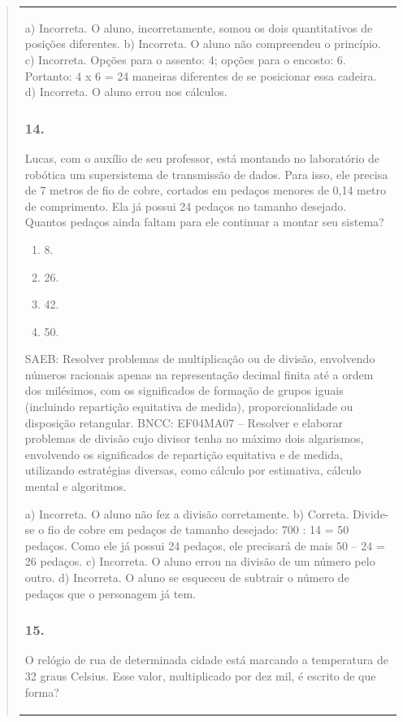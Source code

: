\begin{mdframed}[linewidth=2pt,linecolor=salmao,roundcorner=2pt]
\begin{itemize}
{\begin{itemize}
\begin{escolha}
{\begin{quote}
{\begin{escolha}
{{{{{\begin{longtable}[]{@{}l@{}}
\begin{itemize}
{a) Incorreta. O aluno, incorretamente, somou os dois quantitativos de posições diferentes.
b) Incorreta. O aluno não compreendeu o princípio.
c) Incorreta. Opções para o assento: 4; opções para o encosto: 6. Portanto: 4 x 6 = 24 maneiras diferentes de se posicionar essa cadeira.
d) Incorreta. O aluno errou nos cálculos.

\subsubsection{14.}

Lucas, com o auxílio de seu professor, está montando no laboratório de
robótica um supersistema de transmissão de dados. Para isso, ele
precisa de 7 metros de fio de cobre, cortados em pedaços menores de 0,14
metro de comprimento. Ela já possui 24 pedaços no tamanho desejado. Quantos pedaços ainda
faltam para ele continuar a montar seu sistema?

\begin{enumerate}
\item
  8.
\item
  26.
\item
  42.
\item
  50.
\end{enumerate}

SAEB: Resolver problemas de multiplicação ou de divisão,
envolvendo números racionais apenas na representação decimal finita até
a ordem dos milésimos, com os significados de formação de grupos iguais
(incluindo repartição equitativa de medida), proporcionalidade ou
disposição retangular.
BNCC: EF04MA07 -- Resolver e elaborar problemas de divisão cujo divisor tenha no máximo dois algarismos,
envolvendo os significados de repartição equitativa e de medida, utilizando estratégias diversas,
como cálculo por estimativa, cálculo mental e algoritmos.

a) Incorreta. O aluno não fez a divisão corretamente.
b) Correta. Divide-se o fio de cobre em pedaços de tamanho desejado: 700 : 14 = 50
pedaços. Como ele já possui 24 pedaços, ele precisará de mais 50 -- 24 = 26 pedaços.
c) Incorreta. O aluno errou na divisão de um número pelo outro.
d) Incorreta. O aluno se esqueceu de subtrair o número de pedaços que o personagem já tem.

\subsubsection{15.}

O relógio de rua de determinada cidade está marcando a temperatura
de 32 graus Celsius. Esse valor, multiplicado por dez mil, é escrito de que forma?

}
\end{itemize}
\end{longtable}}}}}}
\end{escolha}}
\end{quote}}
\end{escolha}
\end{itemize}}
\end{itemize}
\end{mdframed}

